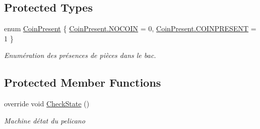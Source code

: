 \subsection*{Protected Types}
\begin{DoxyCompactItemize}
\item 
enum \mbox{\hyperlink{class_device_library_1_1_c_pelicano_a87743bbef8551b7349239f48892309c5}{Coin\+Present}} \{ \mbox{\hyperlink{class_device_library_1_1_c_pelicano_a87743bbef8551b7349239f48892309c5adee032dd5e2484a63525689d39d84689}{Coin\+Present.\+N\+O\+C\+O\+IN}} = 0, 
\mbox{\hyperlink{class_device_library_1_1_c_pelicano_a87743bbef8551b7349239f48892309c5a83c62b7383233ba727dc0f29fa198e22}{Coin\+Present.\+C\+O\+I\+N\+P\+R\+E\+S\+E\+NT}} = 1
 \}
\begin{DoxyCompactList}\small\item\em Enumération des présences de pièces dans le bac. \end{DoxyCompactList}\end{DoxyCompactItemize}
\subsection*{Protected Member Functions}
\begin{DoxyCompactItemize}
\item 
override void \mbox{\hyperlink{class_device_library_1_1_c_pelicano_a148ad12b2f11e1d9e6248b10a91d51df}{Check\+State}} ()
\begin{DoxyCompactList}\small\item\em Machine d\textquotesingle{}état du pelicano \end{DoxyCompactList}\end{DoxyCompactItemize}

